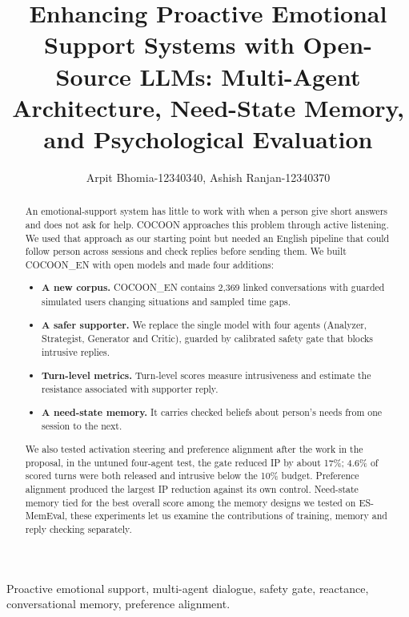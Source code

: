 \documentclass[journal]{IEEEtran}
\begin{document}
\raggedbottom
\title{Enhancing Proactive Emotional Support Systems with Open-Source LLMs: Multi-Agent Architecture, Need-State Memory, and Psychological Evaluation}
\author{Arpit Bhomia-12340340, Ashish Ranjan-12340370}
\markboth{}{}
\maketitle

\begin{abstract}
An emotional-support system has little to work with when a person give short answers and does not ask for help. COCOON approaches this problem through active listening. We used that approach as our starting point but needed an English pipeline that could follow person across sessions and check replies before sending them. We built COCOON\_EN with open models and made four additions:
\begin{itemize}
\item \textbf{A new corpus.} COCOON\_EN contains 2,369 linked conversations with guarded simulated users changing situations and sampled time gaps.
\item \textbf{A safer supporter.} We replace the single model with four agents (Analyzer, Strategist, Generator and Critic), guarded by calibrated safety gate that blocks intrusive replies.
\item \textbf{Turn-level metrics.} Turn-level scores measure intrusiveness and estimate the resistance associated with supporter reply.
\item \textbf{A need-state memory.} It carries checked beliefs about person's needs from one session to the next.
\end{itemize}
We also tested activation steering and preference alignment after the work in the proposal, in the untuned four-agent test, the gate reduced IP by about 17\%; 4.6\% of scored turns were both released and intrusive below the 10\% budget. Preference alignment produced the largest IP reduction against its own control. Need-state memory tied for the best overall score among the memory designs we tested on ES-MemEval, these experiments let us examine the contributions of training, memory and reply checking separately.
\end{abstract}

\begin{IEEEkeywords}
Proactive emotional support, multi-agent dialogue, safety gate, reactance, conversational memory, preference alignment.
\end{IEEEkeywords}
\end{document}
